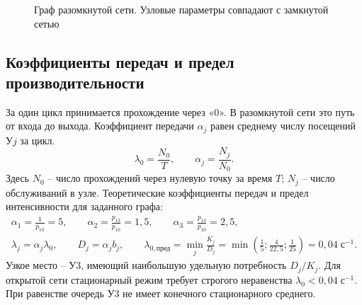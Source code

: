 \documentclass[12pt,a4paper]{article}
\begin{document}
\begin{figure}[H]\centering
{}
\caption{Граф разомкнутой сети. Узловые параметры совпадают с замкнутой сетью}
\end{figure}
\subsection{Коэффициенты передач и предел производительности}
За один цикл принимается прохождение через «0». В разомкнутой сети это путь от входа до выхода. Коэффициент передачи \(\alpha_j\) равен среднему числу посещений У\(j\) за цикл.
\begin{equation}
\lambda_0=\frac{N_0}{T},\qquad \alpha_j=\frac{N_j}{N_0}.
\end{equation}
Здесь \(N_0\) -- число прохождений через нулевую точку за время \(T\); \(N_j\) -- число обслуживаний в узле. Теоретические коэффициенты передач и предел интенсивности для заданного графа:
\begin{gather}
\alpha_1=\frac1{p_{10}}=5,\qquad
\alpha_2=\frac{p_{12}}{p_{10}}=1{,}5,\qquad
\alpha_3=\frac{p_{13}}{p_{10}}=2{,}5,\\
\lambda_j=\alpha_j\lambda_0,\qquad
D_j=\alpha_j b_j,\qquad
\lambda_{0,\text{пред}}=\min_j\frac{K_j}{D_j}
=\min\left(\frac15;\frac4{22{,}5};\frac1{25}\right)
=0{,}04\;\text{с}^{-1}.
\end{gather}
Узкое место -- У3, имеющий наибольшую удельную потребность \(D_j/K_j\). Для открытой сети стационарный режим требует строгого неравенства \(\lambda_0<0{,}04\;\text{с}^{-1}\). При равенстве очередь У3 не имеет конечного стационарного среднего.
\end{document}

